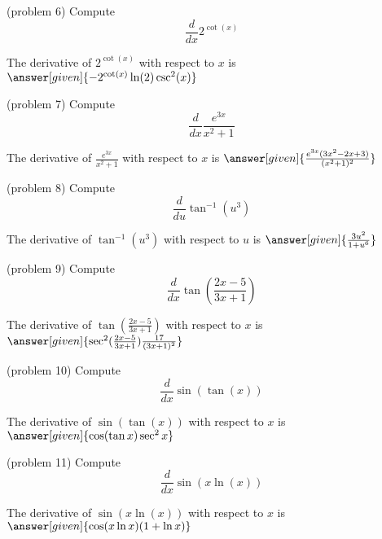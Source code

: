 \documentclass{ximera}
\begin{document}
\begin{problem}(problem 6)
  Compute
  \[
  \frac{d}{dx} 2^{\cot(x)}
  \]
  
    
    
		The derivative of $2^{\cot(x)}$ with respect to $x$ is
		 $\answer[given]{-2^{\cot(x)}\ln(2)\csc^2(x)}$
		
\end{problem}



\begin{problem}(problem 7)
  Compute
  \[
  \frac{d}{dx} \frac{e^{3x}}{x^2 + 1}
  \]
  
    
		The derivative of $\frac{e^{3x}}{x^2 + 1}$ with respect to $x$ is
		 $\answer[given]{\frac{e^{3x}(3x^2 -2x +3)}{(x^2 + 1)^2}}$
		
\end{problem}



\begin{problem}(problem 8)
  Compute
  \[
  \frac{d}{du} \tan^{-1}(u^3)
  \]
  
    
		The derivative of $\tan^{-1}(u^3)$ with respect to $u$ is
		 $\answer[given]{\frac{3u^2}{1+u^6}}$
		
\end{problem}




\begin{problem}(problem 9)
  Compute
  \[
  \frac{d}{dx} \tan\left(\frac{2x-5}{3x+1}\right)
  \]
  
   
		The derivative of $\tan\left(\frac{2x-5}{3x+1}\right)$ with respect to $x$ is
		 $\answer[given]{\sec^2(\frac{2x-5}{3x+1})\frac{17}{(3x+1)^2}}$
		
\end{problem}


\begin{problem}(problem 10)
  Compute
  \[
  \frac{d}{dx} \sin(\tan (x))
  \]
  
    
		The derivative of $\sin(\tan (x))$ with respect to $x$ is
		 $\answer[given]{\cos(\tan x)\sec^2 x}$
		
\end{problem}



\begin{problem}(problem 11)
  Compute
  \[
  \frac{d}{dx} \sin(x\ln (x))
  \]
  
    
		The derivative of $\sin(x\ln (x))$ with respect to $x$ is
		 $\answer[given]{\cos(x\ln x)(1+\ln x)}$
		
\end{problem}
\end{document}
